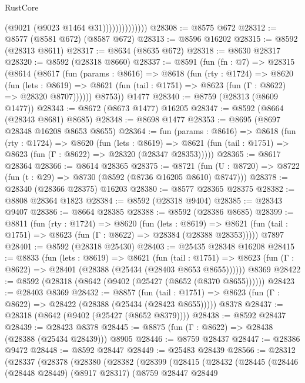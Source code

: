 \begin{lexlean}{RustCore}
\begin{coremodule}
                            (@9021 (@9023 @1464 @31))))))))))))))
@28308 := @8575 @672
@28312 := @8577 (@8581 @672) (@8587 @672)
@28313 := @8596 @16202
@28315 := @8592 (@28313 @8611)
@28317 := @8634 (@8635 @672)
@28318 := @8630 @28317
@28320 := @8592 (@28318 @8660)
@28337 := @8591
    (fun (fn : @7) =>
    @28315
      (@8614
        (@8617
          (fun (params : @8616) =>
          @8618
            (fun (rty : @1724) =>
            @8620
              (fun (lets : @8619) =>
              @8621 (fun (tail : @1751) => @8623 (fun (Γ : @8622) => @28320 @8707))))))
        @8753))
    @1477
@28340 := @8759 (@28313 (@8609 @1477))
@28343 := @8672 (@8673 @1477) @16205
@28347 := @8592 (@8664 (@28343 @8681) @8685)
@28348 := @8698 @1477
@28353 := @8695 (@8697 @28348 @16208 @8653 @8655)
@28364 := fun (params : @8616) =>
  @8618
    (fun (rty : @1724) =>
    @8620
      (fun (lets : @8619) =>
      @8621 (fun (tail : @1751) => @8623 (fun (Γ : @8622) => @28320 (@28347 @28353)))))
@28365 := @8617 @28364
@28366 := @8614 @28365
@28375 := @8721
    (fun (U : @8720) => @8722 (fun (t : @29) => @8730 (@8592 (@8736 @16205 @8610) @8747)))
@28378 := @28340 (@28366 @28375) @16203
@28380 := @8577 @28365 @28375
@28382 := @8808 @28364 @1823
@28384 := @8592 (@28318 @9404)
@28385 := @28343 @9407
@28386 := @8664 @28385
@28388 := @8592 (@28386 @8685)
@28399 := @8811
    (fun (rty : @1724) =>
    @8620
      (fun (lets : @8619) =>
      @8621 (fun (tail : @1751) => @8623 (fun (Γ : @8622) => @28384 (@28388 @28353)))))
    @7897
@28401 := @8592 (@28318 @25430)
@28403 := @25435 @28348 @16208
@28415 := @8833
    (fun (lets : @8619) =>
    @8621
      (fun (tail : @1751) =>
      @8623 (fun (Γ : @8622) => @28401 (@28388 (@25434 (@28403 @8653 @8655))))))
    @8369
@28422 := @8592 (@28318 (@8642 (@9402 (@25427 (@8652 (@8370 @8655))))))
@28423 := @28403 @8369
@28432 := @8857
    (fun (tail : @1751) => @8623 (fun (Γ : @8622) => @28422 (@28388 (@25434 (@28423 @8655)))))
    @8378
@28437 := @28318 (@8642 (@9402 (@25427 (@8652 @8379))))
@28438 := @8592 @28437
@28439 := @28423 @8378
@28445 := @8875 (fun (Γ : @8622) => @28438 (@28388 (@25434 @28439))) @8905
@28446 := @8759 @28437
@28447 := @28386 @9472
@28448 := @8592 @28447
@28449 := @25483 @28439
@28566 := @28312
    (@28337
      (@28378
        (@28380
          (@28382
            (@28399
              (@28415
                (@28432
                  (@28445
                    (@28446
                      (@28448 @28449)
                      (@8917 @28317)
                      (@8759
                        @28447
                        @28449

\end{coremodule}
\end{lexlean}
